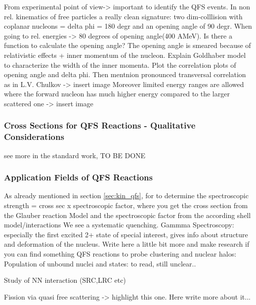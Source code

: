 From experimental point of view-> important to identify the QFS events.
In non rel. kinematics of free particles a really clean signature: two dim-colllision with coplanar nucleons = delta phi = 180 degr and an opening angle of 90 degr. \newline
When going to rel. energies -> 80 degrees of opening angle(400 AMeV). Is there a function to calculate the opening angle? The opening angle is smeared because of relativistic effects + inner momentum of the nucleon. \newline
Explain Goldhaber model to characterize the width of the inner momenta.\newline
Plot the correlation plots of opening angle and delta phi.
Then mentnion pronounced transversal correlation as in L.V. Chulkov -> insert image
Moreover limited energy ranges are allowed where the forward nucleon has much higher energy compared to the larger scattered one -> insert image


\subsubsection{Cross Sections for QFS Reactions - Qualitative Considerations}
see more in the standard work, TO BE DONE
\subsubsection{Application Fields of QFS Reactions}
As already mentioned in section \ref{sec:kin_qfs}, for to determine the spectroscopic strength = cross sec x spectroscopic factor, where you get the cross section from the Glauber reaction Model and the spectroscopic factor from the according shell model/interactions
We see a systematic quenching.
\newline
Gammma Spectroscopy:
especially the first excited 2+ state of special interest, gives info about structure and deformation of the nucleus. Write here a little bit more and make research if you can find something\newline
QFS reactions to probe clustering and nuclear halos:
\newline
Population of unbound nuclei and states: to read, still unclear..\newline

Study of NN interaction (SRC,LRC etc) \newline

Fission via quasi free scattering -> highlight this one. Here write more about it...
\newline



